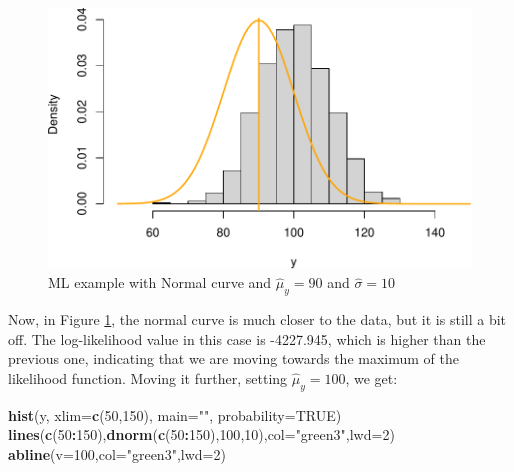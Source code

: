 \documentclass[
]{book}
\newenvironment{Shaded}{\begin{snugshade}}{\end{snugshade}}
\newcommand{\AttributeTok}[1]{\textcolor[rgb]{0.13,0.29,0.53}{#1}}
\newcommand{\ConstantTok}[1]{\textcolor[rgb]{0.56,0.35,0.01}{#1}}
\newcommand{\DecValTok}[1]{\textcolor[rgb]{0.00,0.00,0.81}{#1}}
\newcommand{\FunctionTok}[1]{\textcolor[rgb]{0.13,0.29,0.53}{\textbf{#1}}}
\newcommand{\NormalTok}[1]{#1}
\newcommand{\SpecialCharTok}[1]{\textcolor[rgb]{0.81,0.36,0.00}{\textbf{#1}}}
\newcommand{\StringTok}[1]{\textcolor[rgb]{0.31,0.60,0.02}{#1}}
\theoremstyle{definition}
\theoremstyle{definition}
\theoremstyle{definition}
\theoremstyle{definition}
\theoremstyle{remark}
\begin{document}
\begin{figure}
\centering
\includegraphics{Svetunkov---Statistics-for-Business-Analytics_files/figure-latex/MLENormalExample02-1.pdf}
\caption{\label{fig:MLENormalExample02}ML example with Normal curve and \(\hat{\mu}_y=90\) and \(\hat{\sigma}=10\)}
\end{figure}

Now, in Figure \ref{fig:MLENormalExample02}, the normal curve is much closer to the data, but it is still a bit off. The log-likelihood value in this case is -4227.945, which is higher than the previous one, indicating that we are moving towards the maximum of the likelihood function. Moving it further, setting \(\hat{\mu}_y=100\), we get:

\begin{Shaded}
\begin{Highlighting}[]
\FunctionTok{hist}\NormalTok{(y, }\AttributeTok{xlim=}\FunctionTok{c}\NormalTok{(}\DecValTok{50}\NormalTok{,}\DecValTok{150}\NormalTok{), }\AttributeTok{main=}\StringTok{""}\NormalTok{, }\AttributeTok{probability=}\ConstantTok{TRUE}\NormalTok{)}
\FunctionTok{lines}\NormalTok{(}\FunctionTok{c}\NormalTok{(}\DecValTok{50}\SpecialCharTok{:}\DecValTok{150}\NormalTok{),}\FunctionTok{dnorm}\NormalTok{(}\FunctionTok{c}\NormalTok{(}\DecValTok{50}\SpecialCharTok{:}\DecValTok{150}\NormalTok{),}\DecValTok{100}\NormalTok{,}\DecValTok{10}\NormalTok{),}\AttributeTok{col=}\StringTok{"green3"}\NormalTok{,}\AttributeTok{lwd=}\DecValTok{2}\NormalTok{)}
\FunctionTok{abline}\NormalTok{(}\AttributeTok{v=}\DecValTok{100}\NormalTok{,}\AttributeTok{col=}\StringTok{"green3"}\NormalTok{,}\AttributeTok{lwd=}\DecValTok{2}\NormalTok{)}
\end{Highlighting}
\end{Shaded}
\end{document}
